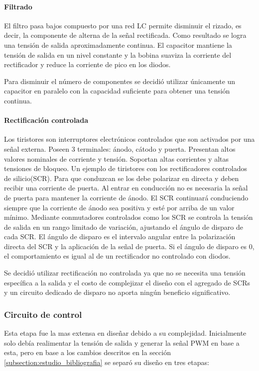 \paragraph{Filtrado}
El filtro pasa bajos compuesto por una red LC permite disminuir el rizado,
es decir, la componente de alterna de la señal rectificada. 
Como resultado se logra una tensión de salida aproximadamente continua.
El capacitor mantiene la tensión de salida en un nivel constante y
la bobina suaviza la corriente del rectificador y reduce la corriente de pico en los diodos. 

Para disminuir el número de componentes se decidió utilizar únicamente
un capacitor en paralelo con la capacidad suficiente para obtener una tensión continua.

\paragraph{Rectificación controlada}

Los tiristores son interruptores electrónicos controlados que son activados por una señal externa. 
Poseen 3 terminales: ánodo, cátodo y puerta. Presentan altos valores nominales de corriente y tensión.
Soportan altas corrientes y altas tensiones de bloqueo. 
Un ejemplo de tiristores con los rectificadores controlados de silicio(SCR).
Para que conduzcan se los debe polarizar en directa y deben recibir una corriente de puerta. 
Al entrar en conducción no es necesaria la señal de puerta para mantener la corriente de ánodo. 
El SCR continuará conduciendo siempre que la corriente de ánodo sea positiva y esté por arriba de un valor mínimo. 
Mediante conmutadores controlados como los SCR se controla la tensión de salida en un rango limitado de variación, ajustando el ángulo de disparo de cada SCR. 
El ángulo de disparo es el intervalo angular entre la polarización directa del SCR y la aplicación de la señal de puerta. 
Si el ángulo de disparo es 0, el comportamiento es igual al de un rectificador no controlado con diodos. 

Se decidió utilizar rectificación no controlada ya que no se necesita una tensión específica a la salida
y el costo de complejizar el diseño con el agregado de SCRs y un circuito dedicado de disparo no aporta ningún beneficio significativo.

\subsubsection{Circuito de control}
Esta etapa fue la mas extensa en diseñar debido a su complejidad.
Inicialmente solo debía realimentar la tensión de salida y generar la señal PWM en base a esta,
pero en base a los cambios descritos en la sección \ref{subsection:estudio_bibliografia}
se separó su diseño en tres etapas:

